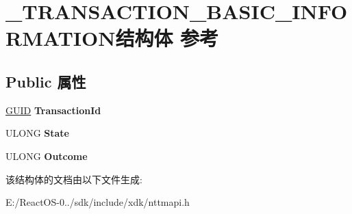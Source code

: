 \hypertarget{struct___t_r_a_n_s_a_c_t_i_o_n___b_a_s_i_c___i_n_f_o_r_m_a_t_i_o_n}{}\section{\+\_\+\+T\+R\+A\+N\+S\+A\+C\+T\+I\+O\+N\+\_\+\+B\+A\+S\+I\+C\+\_\+\+I\+N\+F\+O\+R\+M\+A\+T\+I\+O\+N结构体 参考}
\label{struct___t_r_a_n_s_a_c_t_i_o_n___b_a_s_i_c___i_n_f_o_r_m_a_t_i_o_n}
\subsection*{Public 属性}
\begin{DoxyCompactItemize}
\item 
\mbox{\label{struct___t_r_a_n_s_a_c_t_i_o_n___b_a_s_i_c___i_n_f_o_r_m_a_t_i_o_n_adc5be3ef38e58108fe85e47a8c9916a2}} 
\hyperlink{interface_g_u_i_d}{G\+U\+ID} {\bfseries Transaction\+Id}
\item 
\mbox{\label{struct___t_r_a_n_s_a_c_t_i_o_n___b_a_s_i_c___i_n_f_o_r_m_a_t_i_o_n_a1b37c859c187f98f3f940cf082deac00}} 
U\+L\+O\+NG {\bfseries State}
\item 
\mbox{\label{struct___t_r_a_n_s_a_c_t_i_o_n___b_a_s_i_c___i_n_f_o_r_m_a_t_i_o_n_a4d063627fc5ce871f363bd7d816f4a91}} 
U\+L\+O\+NG {\bfseries Outcome}
\end{DoxyCompactItemize}


该结构体的文档由以下文件生成\+:\begin{DoxyCompactItemize}
\item 
E\+:/\+React\+O\+S-\/0../sdk/include/xdk/nttmapi.\+h\end{DoxyCompactItemize}

